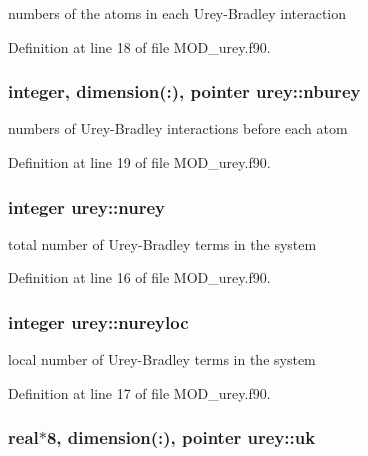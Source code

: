 numbers of the atoms in each Urey-\/\-Bradley interaction 



Definition at line 18 of file M\-O\-D\-\_\-urey.\-f90.

\hypertarget{classurey_a4f87085046f2d60d39c4fd1ad75184ba}{
\subsubsection[{nburey}]{\setlength{\rightskip}{0pt plus 5cm}integer, dimension(\-:), pointer urey\-::nburey}}\label{classurey_a4f87085046f2d60d39c4fd1ad75184ba}


numbers of Urey-\/\-Bradley interactions before each atom 



Definition at line 19 of file M\-O\-D\-\_\-urey.\-f90.

\hypertarget{classurey_a69eb177891f8ef35b6291841f723b5da}{
\subsubsection[{nurey}]{\setlength{\rightskip}{0pt plus 5cm}integer urey\-::nurey}}\label{classurey_a69eb177891f8ef35b6291841f723b5da}


total number of Urey-\/\-Bradley terms in the system 



Definition at line 16 of file M\-O\-D\-\_\-urey.\-f90.

\hypertarget{classurey_a026499b4e231a038a6e81b20c7a1ef2d}{
\subsubsection[{nureyloc}]{\setlength{\rightskip}{0pt plus 5cm}integer urey\-::nureyloc}}\label{classurey_a026499b4e231a038a6e81b20c7a1ef2d}


local number of Urey-\/\-Bradley terms in the system 



Definition at line 17 of file M\-O\-D\-\_\-urey.\-f90.

\hypertarget{classurey_aebf3f1a2659249aa71a3e9e051dfe5fe}{
\subsubsection[{uk}]{\setlength{\rightskip}{0pt plus 5cm}real$\ast$8, dimension(\-:), pointer urey\-::uk}}\label{classurey_aebf3f1a2659249aa71a3e9e051dfe5fe}



